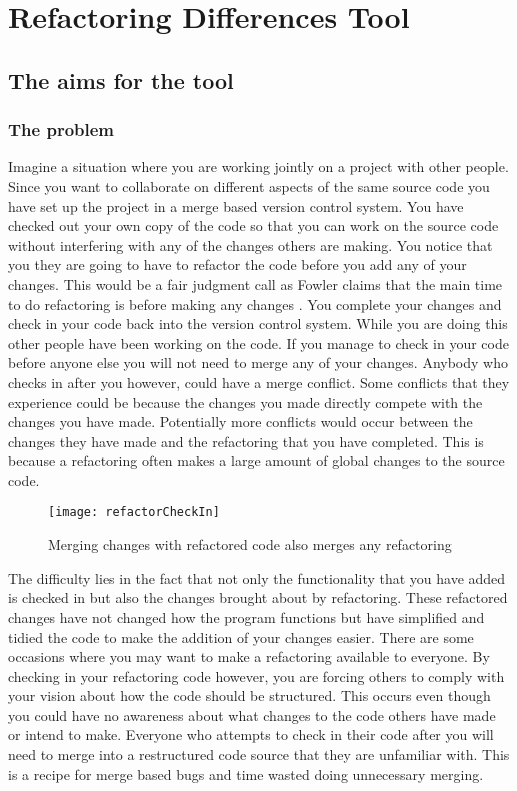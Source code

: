
\chapter{Refactoring Differences Tool}

\section{The aims for the tool}
\subsection{The problem}
Imagine a situation where you are working jointly on a project with other people. Since you want to collaborate on different aspects of the same source code you have set up the project in a merge based version control system.  You have checked out your own copy of the code so that you can work on the source code without interfering with any of the changes others are making. You notice that you they are going to have to refactor the code before you add any of your changes.  This would be a fair judgment call as Fowler claims that the main time to do refactoring is before making any changes \cite{Fowler1999}. You complete your changes and check in your code back into the version control system.  While you are doing this other people have been working on the code.  If you manage to check in your code before anyone else you will not need to merge any of your changes.  Anybody who checks in after you however, could have a merge conflict.  Some conflicts that they experience could be because the changes you made directly compete with the changes you have made. Potentially more conflicts would occur between the changes they have made and the refactoring that you have completed. This is because a refactoring often makes a large amount of global changes to the source code.

\begin{figure}
\begin{center}
\texttt{[image: refactorCheckIn]}
\end{center}
\caption{Merging changes with refactored code also merges any refactoring}
\end{figure}

The difficulty lies in the fact that not only the functionality that you have added is checked in but also the changes brought about by refactoring.  These refactored changes have not changed how the program functions but have simplified and tidied the code to make the addition of your changes easier. There are some occasions where you may want to make a refactoring available to everyone.  By checking in your refactoring code however, you are forcing others to comply with your vision about how the code should be structured.  This occurs even though you could have no awareness about what changes to the code others have made or intend to make.  Everyone who attempts to check in their code after you will need to merge into a restructured code source that they are unfamiliar with.  This is a recipe for merge based bugs and time wasted doing unnecessary merging.


